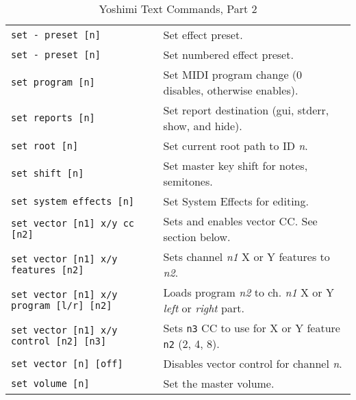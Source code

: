    \begin{table}[H]
      \centering
      \caption{Yoshimi Text Commands, Part 2}
      \label{table:yoshimi_text_commands_part_2}
      \begin{tabular}{l l}

         \texttt{set - preset [n]} &
            Set effect preset. \\

         \texttt{set - preset [n]} &
            Set numbered effect preset. \\

         \texttt{set program [n]} &
            Set MIDI program change (0 disables, otherwise enables). \\

         \texttt{set reports [n]} &
            Set report destination (gui, stderr, show, and hide). \\

         \texttt{set root [n]} &
            Set current root path to ID \textsl{n}. \\

         \texttt{set shift [n]} &
            Set master key shift for notes, semitones. \\

         \texttt{set system effects [n]} &
            Set System Effects for editing. \\

         \texttt{set vector [n1] x/y cc [n2]} &
            Sets and enables vector CC.  See section below. \\

         \texttt{set vector [n1] x/y features [n2]} &
            Sets channel \textsl{n1} X or Y features to \textsl{n2}. \\

         \texttt{set vector [n1] x/y program [l/r] [n2]} &
            Loads program \textsl{n2} to ch. \textsl{n1} X or Y
            \textsl{left} or \textsl{right} part. \\

         \texttt{set vector [n1] x/y control [n2] [n3]} &
            Sets \texttt{n3} CC to use for X or Y feature \texttt{n2}
            (2, 4, 8). \\

         \texttt{set vector [n] [off]} &
            Disables vector control for channel \textsl{n}. \\

         \texttt{set volume [n]} &
            Set the master volume. \\


\end{tabular}
\end{table}

